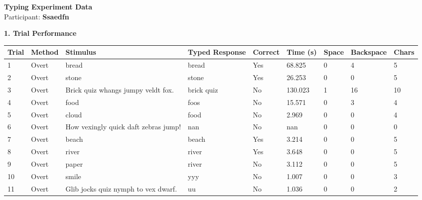\documentclass[10pt,a4paper]{article}
\begin{document}

\begin{center}
    {\Large\bfseries Typing Experiment Data}\\
    \vspace{2pt}
    Participant: \textbf{Ssaedfn}
\end{center}

\vspace{0.25cm}


\noindent
{\large\bfseries 1. Trial Performance}

\vspace{0.08cm}

\begin{center}
\begin{tabularx}{\textwidth}{
    C{0.45in}
    C{0.65in}
    L{2.35in}
    L{2.55in}
    C{0.65in}
    C{0.65in}
    C{0.55in}
    C{0.75in}
    C{0.55in}
}
\toprule

\textbf{Trial} &
\textbf{Method} &
\textbf{Stimulus} &
\textbf{Typed Response} &
\textbf{Correct} &
\textbf{Time (s)} &
\textbf{Space} &
\textbf{Backspace} &
\textbf{Chars}
\\

\midrule

1 &
Overt &
bread &
bread &
Yes &
68.825 &
0 &
4 &
5
\\

2 &
Overt &
stone &
stone &
Yes &
26.253 &
0 &
0 &
5
\\

3 &
Overt &
Brick quiz whangs jumpy veldt fox. &
brick quiz &
No &
130.023 &
1 &
16 &
10
\\

4 &
Overt &
food &
foos &
No &
15.571 &
0 &
3 &
4
\\

5 &
Overt &
cloud &
food &
No &
2.969 &
0 &
0 &
4
\\

6 &
Overt &
How vexingly quick daft zebras jump! &
nan &
No &
nan &
0 &
0 &
0
\\

7 &
Overt &
beach &
beach &
Yes &
3.214 &
0 &
0 &
5
\\

8 &
Overt &
river &
river &
Yes &
3.648 &
0 &
0 &
5
\\

9 &
Overt &
paper &
river &
No &
3.112 &
0 &
0 &
5
\\

10 &
Overt &
smile &
yyy &
No &
1.007 &
0 &
0 &
3
\\

11 &
Overt &
Glib jocks quiz nymph to vex dwarf. &
uu &
No &
1.036 &
0 &
0 &
2
\\

\bottomrule
\end{tabularx}
\end{center}
\end{document}
